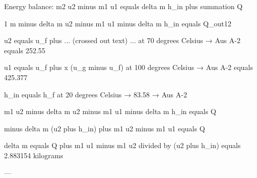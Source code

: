 Energy balance:  
m2 u2 minus m1 u1 equals delta m h_in plus summation Q  

1 m minus delta m u2 minus m1 u1 minus delta m h_in equals Q_out12  

u2 equals u_f plus ... (crossed out text) ... at 70 degrees Celsius → Aus A-2  
equals 252.55  

u1 equals u_f plus x (u_g minus u_f) at 100 degrees Celsius → Aus A-2  
equals 425.377  

h_in equals h_f at 20 degrees Celsius → 83.58 → Aus A-2  

m1 u2 minus delta m u2 minus m1 u1 minus delta m h_in equals Q  

minus delta m (u2 plus h_in) plus m1 u2 minus m1 u1 equals Q  

delta m equals Q plus m1 u1 minus m1 u2 divided by (u2 plus h_in)  
equals 2.883154 kilograms  

---